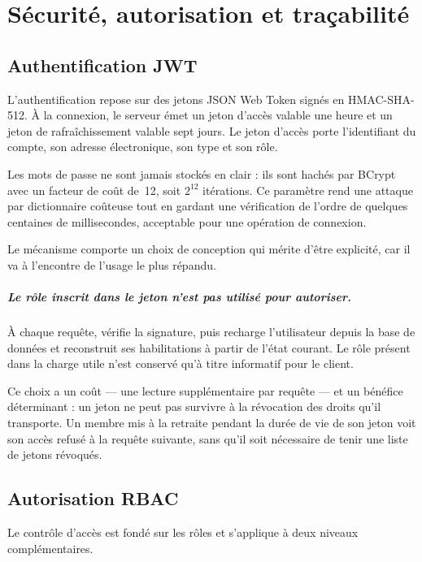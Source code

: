 \chapter{Sécurité, autorisation et traçabilité}
\label{ch:securite}

\section{Authentification JWT}

L'authentification repose sur des jetons JSON Web Token signés en HMAC-SHA-512. À la
connexion, le serveur émet un jeton d'accès valable une heure et un jeton de
rafraîchissement valable sept jours. Le jeton d'accès porte l'identifiant du compte, son
adresse électronique, son type et son rôle.

Les mots de passe ne sont jamais stockés en clair : ils sont hachés par BCrypt avec un
facteur de coût de~12, soit $2^{12}$ itérations. Ce paramètre rend une attaque par
dictionnaire coûteuse tout en gardant une vérification de l'ordre de quelques centaines de
millisecondes, acceptable pour une opération de connexion.

Le mécanisme comporte un choix de conception qui mérite d'être explicité, car il va à
l'encontre de l'usage le plus répandu.

\paragraph{Le rôle inscrit dans le jeton n'est pas utilisé pour autoriser.} À chaque
requête,  vérifie la signature, puis recharge l'utilisateur
depuis la base de données et reconstruit ses habilitations à partir de l'état courant. Le
rôle présent dans la charge utile n'est conservé qu'à titre informatif pour le client.

Ce choix a un coût --- une lecture supplémentaire par requête --- et un bénéfice
déterminant : un jeton ne peut pas survivre à la révocation des droits qu'il transporte. Un
membre mis à la retraite pendant la durée de vie de son jeton voit son accès refusé à la
requête suivante, sans qu'il soit nécessaire de tenir une liste de jetons révoqués.

\section{Autorisation RBAC}

Le contrôle d'accès est fondé sur les rôles et s'applique à deux niveaux complémentaires.

